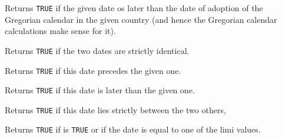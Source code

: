 \label{wxdatetimeisgregoriandate}


Returns {\tt TRUE} if the given date os later than the date of adoption of the
Gregorian calendar in the given country (and hence the Gregorian calendar
calculations make sense for it).


\label{wxdatetimeisequalto}


Returns {\tt TRUE} if the two dates are strictly identical.

\label{wxdatetimeisearlierthan}


Returns {\tt TRUE} if this date precedes the given one.

\label{wxdatetimeislaterthan}


Returns {\tt TRUE} if this date is later than the given one.

\label{wxdatetimeisstrictlybetween}


Returns {\tt TRUE} if this date lies strictly between the two others,



\label{wxdatetimeisbetween}


Returns {\tt TRUE} if 
is {\tt TRUE} or if the date is equal to one of the limi values.



